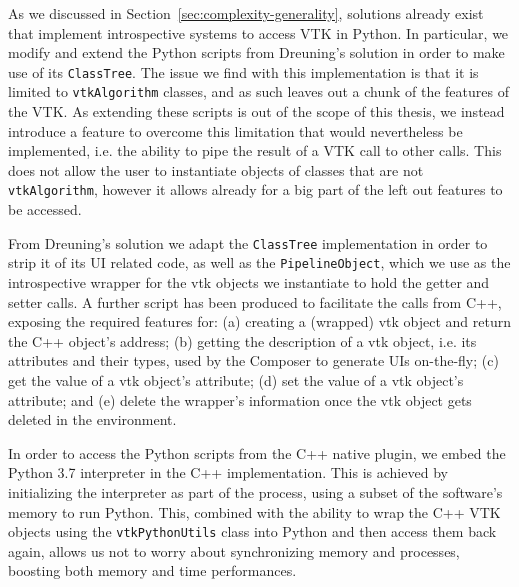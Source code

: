 As we discussed in Section~\ref{sec:complexity-generality}, solutions already exist that implement introspective systems to access VTK in Python. In particular, we modify and extend the Python scripts from Dreuning's solution in order to make use of its \verb|ClassTree|. The issue we find with this implementation is that it is limited to \verb|vtkAlgorithm| classes, and as such leaves out a chunk of the features of the VTK. As extending these scripts is out of the scope of this thesis, we instead introduce a feature to overcome this limitation that would nevertheless be implemented, i.e. the ability to pipe the result of a VTK call to other calls. This does not allow the user to instantiate objects of classes that are not \verb|vtkAlgorithm|, however it allows already for a big part of the left out features to be accessed.

From Dreuning's solution we adapt the \verb|ClassTree| implementation in order to strip it of its UI related code, as well as the \verb|PipelineObject|, which we use as the introspective wrapper for the \acrshort{vtk} objects we instantiate to hold the getter and setter calls. A further script has been produced to facilitate the calls from C++, exposing the required features for: (a) creating a (wrapped) \acrshort{vtk} object and return the C++ object's address; (b) getting the description of a \acrshort{vtk} object, i.e. its attributes and their types, used by the Composer to generate UIs on-the-fly; (c) get the value of a \acrshort{vtk} object's attribute; (d) set the value of a \acrshort{vtk} object's attribute; and (e) delete the wrapper's information once the \acrshort{vtk} object gets deleted in the environment. 

In order to access the Python scripts from the C++ native plugin, we embed the Python 3.7 interpreter in the C++ implementation. This is achieved by initializing the interpreter as part of the process, using a subset of the software's memory to run Python. This, combined with the ability to wrap the C++ VTK objects using the \verb|vtkPythonUtils| class into Python and then access them back again, allows us not to worry about synchronizing memory and processes, boosting both memory and time performances.

